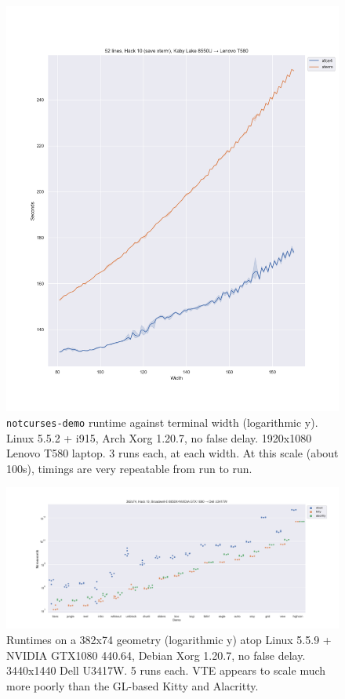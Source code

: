 \begin{figure}[!htb]
\centering
\includegraphics[width=1\textwidth]{media/termsdemo.png}
\caption[Intel i7-8550U benchmarks, varying widths.]{\texttt{notcurses-demo} runtime against terminal width (logarithmic y). Linux 5.5.2 + i915, Arch Xorg 1.20.7, no false delay. 1920x1080 Lenovo T580 laptop. 3 runs each, at each width.
At this scale (about 100s), timings are very repeatable from run to run.}
\label{fig:intel-full}
\end{figure}

\begin{figure}[!htb]
\centering
\includegraphics[width=1\textwidth]{media/d0-large-nvidia.png}
\caption[382x74 NVIDIA GTX 1080 benchmarks.]{Runtimes on a 382x74 geometry (logarithmic y) atop Linux 5.5.9 + NVIDIA GTX1080 440.64, Debian Xorg 1.20.7, no false delay. 3440x1440 Dell U3417W. 5 runs each. VTE appears to scale much more poorly than the GL-based Kitty and Alacritty.}
\label{fig:nvidia-full}
\end{figure}

